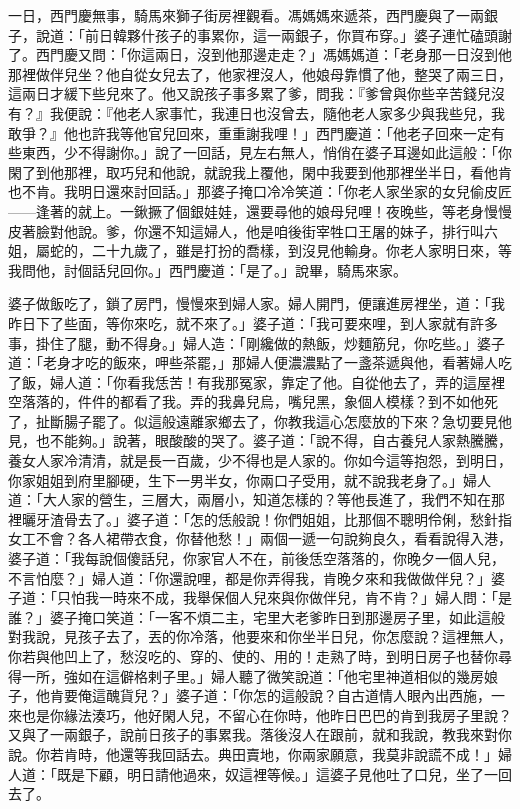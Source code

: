 一日，西門慶無事，騎馬來獅子街房裡觀看。馮媽媽來遞茶，西門慶與了一兩銀子，說道：「前日韓夥什孩子的事累你，這一兩銀子，你買布穿。」婆子連忙磕頭謝了。西門慶又問：「你這兩日，沒到他那邊走走？」馮媽媽道：「老身那一日沒到他那裡做伴兒坐？他自從女兒去了，他家裡沒人，他娘母靠慣了他，整哭了兩三日，這兩日才緩下些兒來了。他又說孩子事多累了爹，問我：『爹曾與你些辛苦錢兒沒有？』我便說：『他老人家事忙，我連日也沒曾去，隨他老人家多少與我些兒，我敢爭？』他也許我等他官兒回來，重重謝我哩！」西門慶道：「他老子回來一定有些東西，少不得謝你。」說了一回話，見左右無人，悄俏在婆子耳邊如此這般：「你閑了到他那裡，取巧兒和他說，就說我上覆他，閑中我要到他那裡坐半日，看他肯也不肯。我明日還來討回話。」那婆子掩口冷冷笑道：「你老人家坐家的女兒偷皮匠——逢著的就上。一鍬撅了個銀娃娃，還要尋他的娘母兒哩！夜晚些，等老身慢慢皮著臉對他說。爹，你還不知這婦人，他是咱後街宰牲口王屠的妹子，排行叫六姐，屬蛇的，二十九歲了，雖是打扮的喬樣，到沒見他輸身。你老人家明日來，等我問他，討個話兒回你。」西門慶道：「是了。」說畢，騎馬來家。

婆子做飯吃了，鎖了房門，慢慢來到婦人家。婦人開門，便讓進房裡坐，道：「我昨日下了些面，等你來吃，就不來了。」婆子道：「我可要來哩，到人家就有許多事，掛住了腿，動不得身。」婦人造：「剛纔做的熱飯，炒麵筋兒，你吃些。」婆子道：「老身才吃的飯來，呷些茶罷，」那婦人便濃濃點了一盞茶遞與他，看著婦人吃了飯，婦人道：「你看我恁苦！有我那冤家，靠定了他。自從他去了，弄的這屋裡空落落的，件件的都看了我。弄的我鼻兒烏，嘴兒黑，象個人模樣？到不如他死了，扯斷腸子罷了。似這般遠離家鄉去了，你教我這心怎麼放的下來？急切要見他見，也不能夠。」說著，眼酸酸的哭了。婆子道：「說不得，自古養兒人家熱騰騰，養女人家冷清清，就是長一百歲，少不得也是人家的。你如今這等抱怨，到明日，你家姐姐到府里腳硬，生下一男半女，你兩口子受用，就不說我老身了。」婦人道：「大人家的營生，三層大，兩層小，知道怎樣的？等他長進了，我們不知在那裡曬牙渣骨去了。」婆子道：「怎的恁般說！你們姐姐，比那個不聰明伶俐，愁針指女工不會？各人裙帶衣食，你替他愁！」兩個一遞一句說夠良久，看看說得入港，婆子道：「我每說個傻話兒，你家官人不在，前後恁空落落的，你晚夕一個人兒，不言怕麼？」婦人道：「你還說哩，都是你弄得我，肯晚夕來和我做做伴兒？」婆子道：「只怕我一時來不成，我舉保個人兒來與你做伴兒，肯不肯？」婦人問：「是誰？」婆子掩口笑道：「一客不煩二主，宅里大老爹昨日到那邊房子里，如此這般對我說，見孩子去了，丟的你冷落，他要來和你坐半日兒，你怎麼說？這裡無人，你若與他凹上了，愁沒吃的、穿的、使的、用的！走熟了時，到明日房子也替你尋得一所，強如在這僻格剌子里。」婦人聽了微笑說道：「他宅里神道相似的幾房娘子，他肯要俺這醜貨兒？」婆子道：「你怎的這般說？自古道情人眼內出西施，一來也是你緣法湊巧，他好閑人兒，不留心在你時，他昨日巴巴的肯到我房子里說？又與了一兩銀子，說前日孩子的事累我。落後沒人在跟前，就和我說，教我來對你說。你若肯時，他還等我回話去。典田賣地，你兩家願意，我莫非說謊不成！」婦人道：「既是下顧，明日請他過來，奴這裡等候。」這婆子見他吐了口兒，坐了一回去了。


